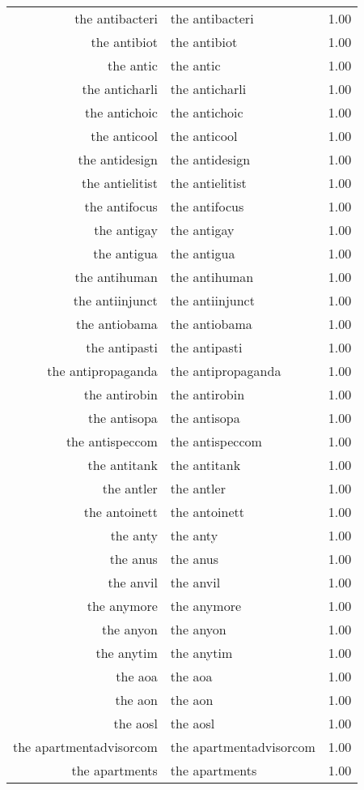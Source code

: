 \begin{table}[ht]
\begin{tabular}{rlr}
  the antibacteri & the antibacteri & 1.00 \\ 
  the antibiot & the antibiot & 1.00 \\ 
  the antic & the antic & 1.00 \\ 
  the anticharli & the anticharli & 1.00 \\ 
  the antichoic & the antichoic & 1.00 \\ 
  the anticool & the anticool & 1.00 \\ 
  the antidesign & the antidesign & 1.00 \\ 
  the antielitist & the antielitist & 1.00 \\ 
  the antifocus & the antifocus & 1.00 \\ 
  the antigay & the antigay & 1.00 \\ 
  the antigua & the antigua & 1.00 \\ 
  the antihuman & the antihuman & 1.00 \\ 
  the antiinjunct & the antiinjunct & 1.00 \\ 
  the antiobama & the antiobama & 1.00 \\ 
  the antipasti & the antipasti & 1.00 \\ 
  the antipropaganda & the antipropaganda & 1.00 \\ 
  the antirobin & the antirobin & 1.00 \\ 
  the antisopa & the antisopa & 1.00 \\ 
  the antispeccom & the antispeccom & 1.00 \\ 
  the antitank & the antitank & 1.00 \\ 
  the antler & the antler & 1.00 \\ 
  the antoinett & the antoinett & 1.00 \\ 
  the anty & the anty & 1.00 \\ 
  the anus & the anus & 1.00 \\ 
  the anvil & the anvil & 1.00 \\ 
  the anymore & the anymore & 1.00 \\ 
  the anyon & the anyon & 1.00 \\ 
  the anytim & the anytim & 1.00 \\ 
  the aoa & the aoa & 1.00 \\ 
  the aon & the aon & 1.00 \\ 
  the aosl & the aosl & 1.00 \\ 
  the apartmentadvisorcom & the apartmentadvisorcom & 1.00 \\ 
  the apartments & the apartments & 1.00 \\ 

\end{tabular}
\end{table}
